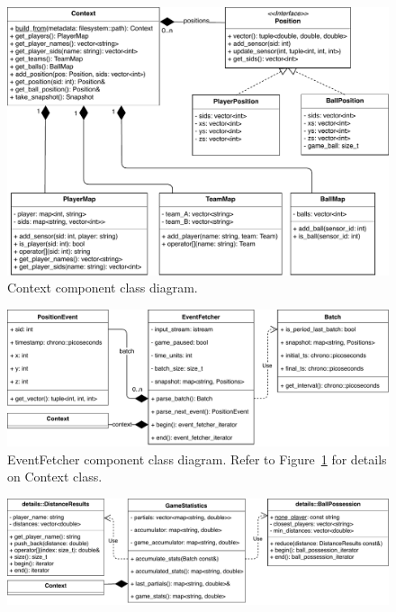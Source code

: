 \documentclass[a4paper, 11pt]{article}
\begin{document}
\begin{appendices}
\begin{figure}[h!]
    \centering
    \includegraphics[height=.43\textheight, width=1\textwidth, keepaspectratio]{UML/context_class_diagram.pdf}
    \caption{Context component class diagram.}
    \label{fig:context_class}
\end{figure}
\begin{figure}[h!]
    \centering
    \includegraphics[height=.6\textheight, width=1\textwidth, keepaspectratio]{UML/event_fetcher_class_diagram.pdf}
    \caption{EventFetcher component class diagram. Refer to Figure~\ref{fig:context_class} for details on Context class.}
    \label{fig:event_fetcher_class}
\end{figure}
\begin{figure}[h!]
    \centering
    \includegraphics[height=.5\textheight, width=1\textwidth, keepaspectratio]{UML/game_statistics_class_diagram.pdf}

\end{figure}
\end{appendices}
\end{document}

